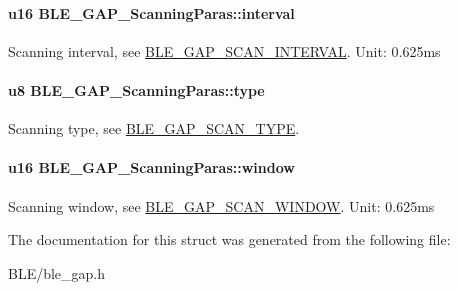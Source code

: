 \paragraph[{\texorpdfstring{interval}{interval}}]{\setlength{\rightskip}{0pt plus 5cm}u16 B\+L\+E\+\_\+\+G\+A\+P\+\_\+\+Scanning\+Paras\+::interval}\hypertarget{struct_b_l_e___g_a_p___scanning_paras_a21ee18c1250e1b3c0047b1b34c15c02c}{}\label{struct_b_l_e___g_a_p___scanning_paras_a21ee18c1250e1b3c0047b1b34c15c02c}
Scanning interval, see \hyperlink{group___b_l_e___g_a_p___s_c_a_n___i_n_t_e_r_v_a_l}{B\+L\+E\+\_\+\+G\+A\+P\+\_\+\+S\+C\+A\+N\+\_\+\+I\+N\+T\+E\+R\+V\+AL}. Unit\+: 0.\+625ms 
\paragraph[{\texorpdfstring{type}{type}}]{\setlength{\rightskip}{0pt plus 5cm}u8 B\+L\+E\+\_\+\+G\+A\+P\+\_\+\+Scanning\+Paras\+::type}\hypertarget{struct_b_l_e___g_a_p___scanning_paras_a8a71587929f154eab6853bf564525b48}{}\label{struct_b_l_e___g_a_p___scanning_paras_a8a71587929f154eab6853bf564525b48}
Scanning type, see \hyperlink{group___b_l_e___g_a_p___s_c_a_n___t_y_p_e}{B\+L\+E\+\_\+\+G\+A\+P\+\_\+\+S\+C\+A\+N\+\_\+\+T\+Y\+PE}. 
\paragraph[{\texorpdfstring{window}{window}}]{\setlength{\rightskip}{0pt plus 5cm}u16 B\+L\+E\+\_\+\+G\+A\+P\+\_\+\+Scanning\+Paras\+::window}\hypertarget{struct_b_l_e___g_a_p___scanning_paras_a8385c953beffd40acae708f2c04ec114}{}\label{struct_b_l_e___g_a_p___scanning_paras_a8385c953beffd40acae708f2c04ec114}
Scanning window, see \hyperlink{group___b_l_e___g_a_p___s_c_a_n___w_i_n_d_o_w}{B\+L\+E\+\_\+\+G\+A\+P\+\_\+\+S\+C\+A\+N\+\_\+\+W\+I\+N\+D\+OW}. Unit\+: 0.\+625ms 

The documentation for this struct was generated from the following file\+:\begin{DoxyCompactItemize}
\item 
B\+L\+E/ble\+\_\+gap.\+h\end{DoxyCompactItemize}
